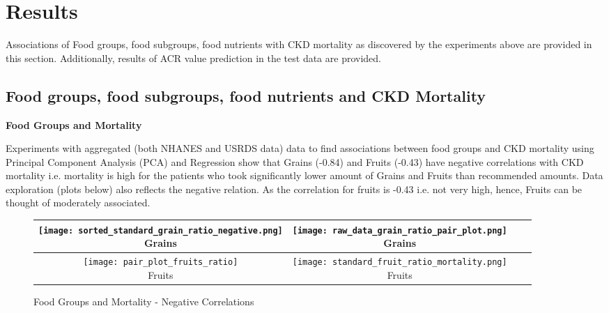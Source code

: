 \section{Results}
Associations of Food groups, food subgroups, food nutrients with CKD mortality as discovered by the experiments above are provided in this section. Additionally, results of ACR value prediction in the test data are provided.

\subsection{Food groups, food subgroups, food nutrients and CKD Mortality}
\noindent \textbf{Food Groups and Mortality}

\noindent Experiments with aggregated (both NHANES and USRDS data) data to find associations between food groups and CKD mortality using Principal Component Analysis (PCA) and Regression show that Grains (-0.84) and Fruits (-0.43) have negative correlations with CKD mortality i.e. mortality is high for the patients who took significantly lower amount of Grains and Fruits than recommended amounts. Data exploration (plots below) also reflects the negative relation. As the correlation for fruits is -0.43 i.e. not very high, hence, Fruits can be thought of moderately associated.

\begin{center}
\begin{figure}
\centering
\caption{Food Groups and Mortality - Negative Correlations}
\vspace{0.25cm}
\small
\begin{tabular}{ | c | c | c |  c |  }	
\hline
\hline
\specialcell{\texttt{[image: sorted\_standard\_grain\_ratio\_negative.png]} \\ Grains }	&  \specialcell{ \texttt{[image: raw\_data\_grain\_ratio\_pair\_plot.png]}\\ Grains } \\
\hline
\hline
\specialcell{\texttt{[image: pair\_plot\_fruits\_ratio]} \\ Fruits} & \specialcell{ \texttt{[image: standard\_fruit\_ratio\_mortality.png]} \\ Fruits} \\
\hline
\end{tabular}
\end{figure}
\end{center}

